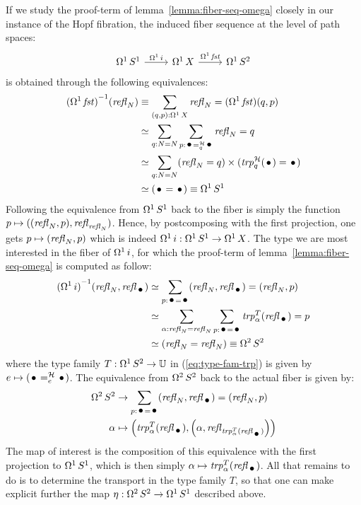 \documentclass[english,a4]{article}
\def\U{\universe U}%
\begin{document}
If we study the proof-term of lemma~\ref{lemma:fiber-seq-omega}
closely in our instance of the Hopf fibration, the induced fiber
sequence at the level of path spaces:
\begin{equation}
  \label{eq:12}
  \begin{tikzcd}
    \loopspace 1 \Sc \rar["\loopspace 1 i"] & \loopspace 1 X \rar["\loopspace 1 \fst"] & \loopspace 1 \Sp
  \end{tikzcd}
\end{equation}
is obtained through the following equivalences:
\begin{align}
  \inv {(\loopspace 1 \fst)} {(\refl N)}
  &\jdeq \sum_{(q,p):\loopspace 1 X}\refl N = (\loopspace 1 \fst)(q,p)
  \\
  &\weq \sum_{q:N=N}\sum_{p:\pathover \base {\hopffam} q \base}\refl N = q
  \\
  &\weq \sum_{q:N=N}(\refl N = q)\times(\trp[\hopffam]{q} (\base) =\base)
  \\
  &\weq (\base = \base) \jdeq \loopspace 1 \Sc
\end{align}
Following the equivalence from $\mathop{\Omega^{1}} {S^1}$ back to the fiber is
simply the function $p \mapsto ((\mathop{{\mathit{refl}}_{N}},p),\mathop{{\mathit{refl}}_{\mathop{{\mathit{refl}}_{N}}}})$. Hence,
by postcomposing with the first projection, one gets
$p \mapsto (\mathop{{\mathit{refl}}_{N}}, p)$ which is indeed
$\mathop{\Omega^{1}} i: \mathop{\Omega^{1}} {S^1} \to \mathop{\Omega^{1}} X$. The type we are
most interested in the fiber of $\mathop{\Omega^{1}} i$, for which the
proof-term of lemma~\ref{lemma:fiber-seq-omega} is computed as follow:
\begin{align}
  \inv {(\loopspace 1 i)} {(\refl N,\refl\base)}
  &\weq \sum_{p:\base = \base}(\refl N,\refl\base) = (\refl N,p)
  \\
  &\weq \sum_{\alpha:\refl N = \refl N}\sum_{p:\base=\base}\trp [T]{\alpha}(\refl \base)
 = p \label{eq:type-fam-trp}
  \\
  &\weq (\refl N = \refl N) \jdeq \loopspace 2 \Sp
\end{align}
where the type family $T:\loopspace 1 \Sp \to \U$ in
(\ref{eq:type-fam-trp}) is given by
$e\mapsto {(\pathover \base \hopffam e \base)}$. The equivalence from
$\mathop{\Omega^{2}} {S^2}$ back to the actual fiber is given by:
\begin{equation}
  \begin{aligned}
    \loopspace 2 \Sp &\to \sum_{p:\base = \base}(\refl N,\refl\base) =
    (\refl N,p)
    \\
    \alpha &\mapsto \left(\trp[T]{\alpha}(\refl\base), \left(\alpha,
        \refl{\trp[T]{\alpha}(\refl\base)}\right)\right)
  \end{aligned}
\end{equation}
The map of interest is the composition of this equivalence with the
first projection to $\mathop{\Omega^{1}} {S^1}$, which is then simply
$\alpha \mapsto \trp[T]{\alpha}(\refl \base)$. All that remains to do
is to determine the transport in the type family $T$, so that one can
make explicit further the map $\eta:\mathop{\Omega^{2}} {S^2} \to \mathop{\Omega^{1}} {S^1}$
described above.
\end{document}

